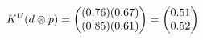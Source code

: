 \documentclass[preview]{standalone}
\begin{document}
\begin{align*}
\special{dvisvgm:raw <g id='unique000'>}K^U(d \otimes p) = \begin{pmatrix} (0.76)(0.67) \\ (0.85)(0.61) \end{pmatrix} = \begin{pmatrix} 0.51 \\ 0.52 \end{pmatrix}\special{dvisvgm:raw </g>}
\end{align*}
\end{document}
